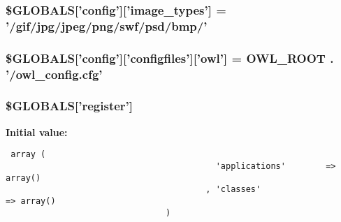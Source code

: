 \hypertarget{config_8php_335a0ed5b0fc63ef47f9ba1d91e41dc6}{
\subsubsection{\setlength{\rightskip}{0pt plus 5cm}\$GLOBALS\mbox{[}'config'\mbox{]}\mbox{[}'image\_\-types'\mbox{]} = '/gif/jpg/jpeg/png/swf/psd/bmp/'}}
\label{config_8php_335a0ed5b0fc63ef47f9ba1d91e41dc6}


\hypertarget{config_8php_36e909583250c43d72bdc7c09e2d4a20}{
\subsubsection{\setlength{\rightskip}{0pt plus 5cm}\$GLOBALS\mbox{[}'config'\mbox{]}\mbox{[}'configfiles'\mbox{]}\mbox{[}'owl'\mbox{]} = {\bf OWL\_\-ROOT} . '/owl\_\-config.cfg'}}
\label{config_8php_36e909583250c43d72bdc7c09e2d4a20}


\hypertarget{config_8php_6cc1ef3a8c20d69988531d27f931855b}{
\subsubsection{\setlength{\rightskip}{0pt plus 5cm}\$GLOBALS\mbox{[}'register'\mbox{]}}}
\label{config_8php_6cc1ef3a8c20d69988531d27f931855b}


\textbf{Initial value:}

\begin{Code}\begin{verbatim} array (
                                          'applications'        => array()
                                        , 'classes'                     => array()
                                )
\end{verbatim}
\end{Code}
